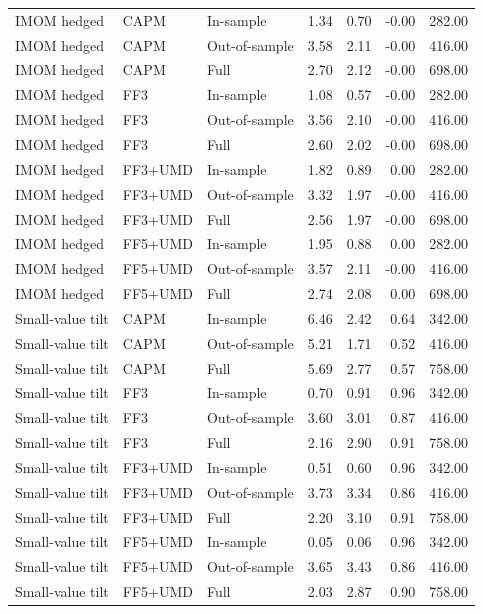 \begin{tabular}{lllrrrr}
IMOM hedged & CAPM & In-sample & 1.34 & 0.70 & -0.00 & 282.00 \\
IMOM hedged & CAPM & Out-of-sample & 3.58 & 2.11 & -0.00 & 416.00 \\
IMOM hedged & CAPM & Full & 2.70 & 2.12 & -0.00 & 698.00 \\
IMOM hedged & FF3 & In-sample & 1.08 & 0.57 & -0.00 & 282.00 \\
IMOM hedged & FF3 & Out-of-sample & 3.56 & 2.10 & -0.00 & 416.00 \\
IMOM hedged & FF3 & Full & 2.60 & 2.02 & -0.00 & 698.00 \\
IMOM hedged & FF3+UMD & In-sample & 1.82 & 0.89 & 0.00 & 282.00 \\
IMOM hedged & FF3+UMD & Out-of-sample & 3.32 & 1.97 & -0.00 & 416.00 \\
IMOM hedged & FF3+UMD & Full & 2.56 & 1.97 & -0.00 & 698.00 \\
IMOM hedged & FF5+UMD & In-sample & 1.95 & 0.88 & 0.00 & 282.00 \\
IMOM hedged & FF5+UMD & Out-of-sample & 3.57 & 2.11 & -0.00 & 416.00 \\
IMOM hedged & FF5+UMD & Full & 2.74 & 2.08 & 0.00 & 698.00 \\
Small-value tilt & CAPM & In-sample & 6.46 & 2.42 & 0.64 & 342.00 \\
Small-value tilt & CAPM & Out-of-sample & 5.21 & 1.71 & 0.52 & 416.00 \\
Small-value tilt & CAPM & Full & 5.69 & 2.77 & 0.57 & 758.00 \\
Small-value tilt & FF3 & In-sample & 0.70 & 0.91 & 0.96 & 342.00 \\
Small-value tilt & FF3 & Out-of-sample & 3.60 & 3.01 & 0.87 & 416.00 \\
Small-value tilt & FF3 & Full & 2.16 & 2.90 & 0.91 & 758.00 \\
Small-value tilt & FF3+UMD & In-sample & 0.51 & 0.60 & 0.96 & 342.00 \\
Small-value tilt & FF3+UMD & Out-of-sample & 3.73 & 3.34 & 0.86 & 416.00 \\
Small-value tilt & FF3+UMD & Full & 2.20 & 3.10 & 0.91 & 758.00 \\
Small-value tilt & FF5+UMD & In-sample & 0.05 & 0.06 & 0.96 & 342.00 \\
Small-value tilt & FF5+UMD & Out-of-sample & 3.65 & 3.43 & 0.86 & 416.00 \\
Small-value tilt & FF5+UMD & Full & 2.03 & 2.87 & 0.90 & 758.00 \\
\bottomrule
\end{tabular}
